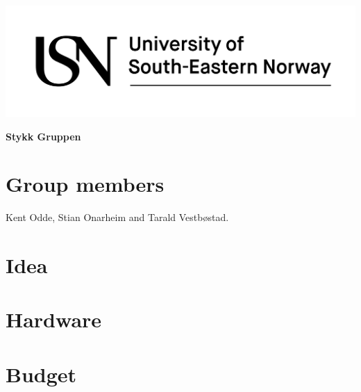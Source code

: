 \documentclass[12pt]{article}
\begin{document}
\begin{titlepage}
	\begin{center}
		\includegraphics[width=\textwidth]{USN_logo_En_rgb}

		\textbf{Stykk Gruppen}
	\end{center}
\end{titlepage}

\newpage

\section{Group members}

Kent Odde, Stian Onarheim and Tarald Vestbøstad.

\section{Idea}

\section{Hardware}

\section{Budget}
\end{document}
